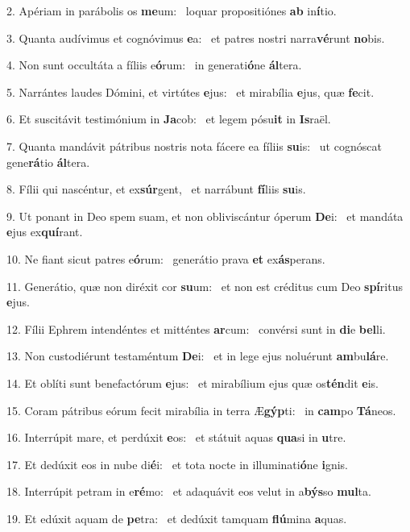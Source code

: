 2. Apériam in parábolis os \textbf{me}um: \ast\  loquar propositiónes \textbf{ab} in\textbf{í}tio.\

3. Quanta audívimus et cognóvimus \textbf{e}a: \ast\  et patres nostri narra\textbf{vé}runt \textbf{no}bis.\

4. Non sunt occultáta a fíliis e\textbf{ó}rum: \ast\  in generati\textbf{ó}ne \textbf{ál}tera.\

5. Narrántes laudes Dómini, et virtútes \textbf{e}jus: \ast\  et mirabília \textbf{e}jus, quæ \textbf{fe}cit.\

6. Et suscitávit testimónium in \textbf{Ja}cob: \ast\  et legem pósu\textbf{it} in \textbf{Is}raël.\

7. Quanta mandávit pátribus nostris nota fácere ea fíliis \textbf{su}is: \ast\  ut cognóscat gene\textbf{rá}tio \textbf{ál}tera.\

8. Fílii qui nascéntur, et ex\textbf{súr}gent, \ast\  et narrábunt \textbf{fí}liis \textbf{su}is.\

9. Ut ponant in Deo spem suam, et non obliviscántur óperum \textbf{De}i: \ast\  et mandáta \textbf{e}jus ex\textbf{quí}rant.\

10. Ne fiant sicut patres e\textbf{ó}rum: \ast\  generátio prava \textbf{et} ex\textbf{ás}perans.\

11. Generátio, quæ non diréxit cor \textbf{su}um: \ast\  et non est créditus cum Deo \textbf{spí}ritus \textbf{e}jus.\

12. Fílii Ephrem intendéntes et mitténtes \textbf{ar}cum: \ast\  convérsi sunt in \textbf{di}e \textbf{bel}li.\

13. Non custodiérunt testaméntum \textbf{De}i: \ast\  et in lege ejus noluérunt \textbf{am}bu\textbf{lá}re.\

14. Et oblíti sunt benefactórum \textbf{e}jus: \ast\  et mirabílium ejus quæ os\textbf{tén}dit \textbf{e}is.\

15. Coram pátribus eórum fecit mirabília in terra Æ\textbf{gýp}ti: \ast\  in \textbf{cam}po \textbf{Tá}neos.\

16. Interrúpit mare, et perdúxit \textbf{e}os: \ast\  et státuit aquas \textbf{qua}si in \textbf{u}tre.\

17. Et dedúxit eos in nube di\textbf{é}i: \ast\  et tota nocte in illuminati\textbf{ó}ne \textbf{i}gnis.\

18. Interrúpit petram in e\textbf{ré}mo: \ast\  et adaquávit eos velut in a\textbf{býs}so \textbf{mul}ta.\

19. Et edúxit aquam de \textbf{pe}tra: \ast\  et dedúxit tamquam \textbf{flú}mina \textbf{a}quas.\

